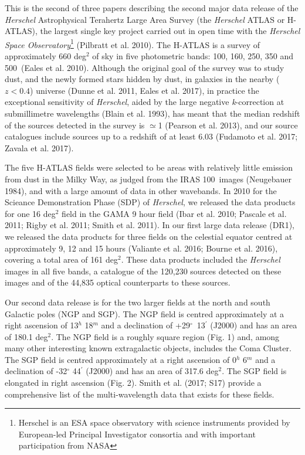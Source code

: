 \documentclass[useAMS,usenatbib]{mnras}
\begin{document}
This is the second of three papers describing the second major data
release of the {\it Herschel} Astrophysical Terahertz Large Area
Survey (the {\it Herschel} ATLAS or H-ATLAS), the largest single key
project carried out in open time with the {\it Herschel Space
  Observatory}\footnote{Herschel is an ESA space observatory with
  science instruments provided by European-led Principal Investigator
  consortia and with important participation from NASA} (Pilbratt et
al.  2010).  The H-ATLAS is a survey of approximately 660 deg$^2$ of
sky in five photometric bands: 100, 160, 250, 350 and 500\micron\
(Eales et al.  2010).  Although the original goal of the survey was to
study dust, and the newly formed stars hidden by dust, in galaxies in
the nearby ($z<0.4$) universe (Dunne et al. 2011, Eales et al. 2017),
in practice the exceptional sensitivity of {\it Herschel}, aided by
the large negative {\it k}-correction at submillimetre wavelengths
(Blain et al. 1993), has meant that the median redshift of the sources
detected in the survey is $\simeq$1 (Pearson et al. 2013), and our
source catalogues include sources up to a redshift of at least 6.03
(Fudamoto et al. 2017; Zavala et al. 2017).

The five H-ATLAS fields were selected to be areas with relatively
little emission from dust in the Milky Way, as judged from the IRAS
100\micron\ images (Neugebauer 1984), and with a large amount of data
in other wavebands. In 2010 for the Scieance Demonstration Phase (SDP)
of {\it Herschel}, we released the data products for one 16 deg$^2$
field in the GAMA 9 hour field (Ibar et al. 2010; Pascale et al. 2011;
Rigby et al. 2011; Smith et al. 2011).  In our first large data
release (DR1), we released the data products for three fields on the
celestial equator centred at approximately 9, 12 and 15 hours
(Valiante et al. 2016; Bourne et al.  2016), covering a total area of
161 deg$^2$.  These data products included the {\it Herschel} images
in all five bands, a catalogue of the 120,230 sources detected on
these images and of the 44,835 optical counterparts to these sources.

Our second data release is for the two larger fields at the north and south Galactic
poles (NGP and SGP). The NGP field is centred 
approximately at a right ascension of 13$^{h}$ 18$^{m}$ and
a declination of +29$^{\circ}$\ 13$^{\prime}$ (J2000) and has
an area of 180.1 deg$^2$. 
The NGP field is a roughly square region
(Fig. 1) and, among many other interesting known
extragalactic objects, includes the Coma Cluster.
The SGP field is centred approximately at a right ascension of 0$^{h}$ 6$^{m}$ and a declination of -32$^{\circ}$ 44$^{\prime}$ (J2000)
and has an area of 317.6 deg$^2$. The SGP field is elongated
in right ascension (Fig. 2).
Smith et al. (2017; S17) provide a comprehensive list
of the multi-wavelength data that exists for these fields.
\end{document}
